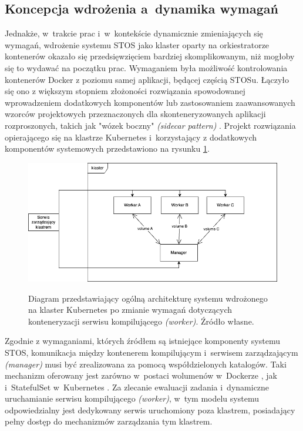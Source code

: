 \subsection{Koncepcja wdrożenia a~dynamika wymagań}
Jednakże, w~trakcie prac i~w~kontekście dynamicznie zmieniających się wymagań, wdrożenie systemu STOS jako klaster oparty na orkiestratorze kontenerów okazało się przedsięwzięciem bardziej skomplikowanym, niż mogłoby się to wydawać na początku prac. Wymaganiem była możliwość kontrolowania kontenerów Docker z poziomu samej aplikacji, będącej częścią STOSu. Łączyło się ono z większym stopniem złożoności rozwiązania spowodowanej wprowadzeniem dodatkowych komponentów lub zastosowaniem zaawansowanych wzorców projektowych przeznaczonych dla skonteneryzowanych aplikacji rozproszonych, takich jak "wózek boczny" \textit{(sidecar pattern)} \cite{k8sPatterns}. Projekt rozwiązania opierającego się na klastrze Kubernetes i~korzystający z dodatkowych komponentów systemowych przedstawiono na rysunku \ref{diagramk8sFinal}.

\begin{figure}[!h]
	\begin{center}
		\resizebox{0.7\textwidth}{!} {
			\includegraphics{img/4/k8sFinal.png}
		}
		\caption[Diagram prototypu klastra Kubernetes po zmianie architektury]{Diagram przedstawiający ogólną architekturę systemu wdrożonego na klaster Kubernetes po zmianie wymagań dotyczących konteneryzacji serwisu kompilującego \textit{(worker)}. Źródło własne.}
		\label{diagramk8sFinal}
	\end{center}
\end{figure}

Zgodnie z wymaganiami, których źródłem są istniejące komponenty systemu STOS, komunikacja między kontenerem kompilującym i~serwisem zarządzającym \textit{(manager)} musi być zrealizowana za pomocą współdzielonych katalogów. Taki mechanizm oferowany jest zarówno w~postaci wolumenów w~Dockerze \cite{dockerVolume}, jak i~StatefulSet w~Kubernetes \cite{k8sStateful}. Za zlecanie ewaluacji zadania i~dynamiczne uruchamianie serwisu kompilującego \textit{(worker)}, w~tym modelu systemu odpowiedzialny jest dedykowany serwis uruchomiony poza klastrem, posiadający pełny dostęp do mechanizmów zarządzania tym klastrem.

